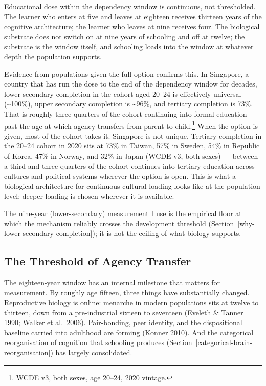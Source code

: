 \documentclass[12pt,letterpaper]{article}
\begin{document}
Educational dose within the dependency window is continuous, not
thresholded. The learner who enters at five and leaves at eighteen
receives thirteen years of the cognitive architecture; the learner
who leaves at nine receives four. The biological substrate does not
switch on at nine years of schooling and off at twelve; the substrate
is the window itself, and schooling loads into the window at whatever
depth the population supports.

Evidence from populations given the full option confirms this. In
Singapore, a country that has run the dose to the end of the
dependency window for decades, lower secondary completion in the
cohort aged 20--24 is effectively universal (\textasciitilde 100\%),
upper secondary completion is \textasciitilde 96\%, and tertiary
completion is 73\%. That is roughly three-quarters of the cohort
continuing into formal education past the age at which agency
transfers from parent to child.\footnote{WCDE v3, both sexes, age
20--24, 2020 vintage.}
When the option is given, most of the cohort takes it. Singapore is
not unique. Tertiary completion in the 20--24 cohort in 2020 sits at
73\% in Taiwan, 57\% in Sweden, 54\% in Republic of Korea, 47\% in
Norway, and 32\% in Japan (WCDE v3, both sexes) ---
between a third and three-quarters of the cohort continues into
tertiary education across cultures and political systems wherever the
option is open. This is what a biological architecture for continuous
cultural loading looks like at the population level: deeper loading
is chosen wherever it is available.

The nine-year (lower-secondary) measurement I use is
the empirical floor at which the mechanism reliably crosses the
development threshold (Section~\ref{why-lower-secondary-completion}); it is
not the ceiling of what biology supports.

\subsection{The Threshold of Agency Transfer}\label{the-threshold-of-agency-transfer}

The eighteen-year window has an internal milestone that matters for
measurement. By roughly age fifteen, three things have substantially
changed. Reproductive biology is online: menarche in modern
populations sits at twelve to thirteen, down from a pre-industrial
sixteen to seventeen (Eveleth \& Tanner 1990; Walker et al.~2006).
Pair-bonding, peer identity, and the dispositional baseline carried
into adulthood are forming (Konner 2010). And the categorical
reorganisation of cognition that schooling produces
(Section~\ref{categorical-brain-reorganisation}) has largely
consolidated.
\end{document}
